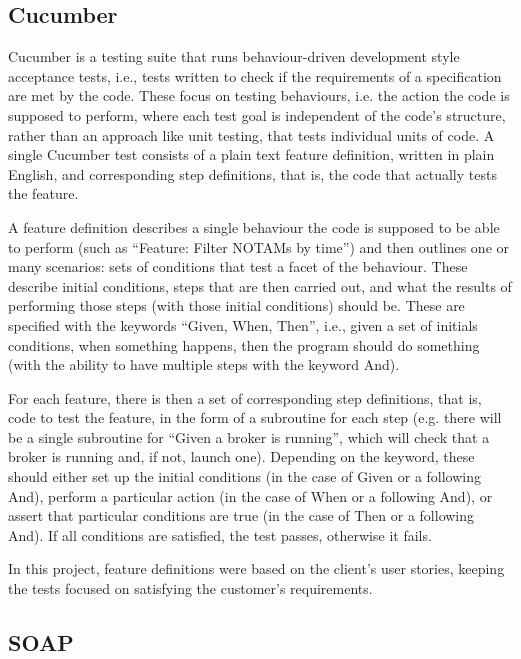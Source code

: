 \documentclass[a4paper, 12pt, twoside]{article}
\begin{document}
\subsection{Cucumber}
\label{sec:bg_cucumber}

Cucumber is a testing suite that runs behaviour-driven development style acceptance tests\cite{cucumber}, i.e., tests written to check if the requirements of a specification are met by the code. These focus on testing behaviours, i.e. the action the code is supposed to perform, where each test goal is independent of the code’s structure, rather than an approach like unit testing, that tests individual units of code.
A single Cucumber test consists of a plain text feature definition, written in plain English, and corresponding step definitions, that is, the code that actually tests the feature.

A feature definition describes a single behaviour the code is supposed to be able to perform (such as ``Feature: Filter NOTAMs by time'') and then outlines one or many scenarios: sets of conditions that test a facet of the behaviour. These describe initial conditions, steps that are then carried out, and what the results of performing those steps (with those initial conditions) should be. These are specified with the keywords ``Given, When, Then'', i.e., given a set of initials conditions, when something happens, then the program should do something (with the ability to have multiple steps with the keyword And).

For each feature, there is then a set of corresponding step definitions, that is, code to test the feature, in the form of a subroutine for each step (e.g. there will be a single subroutine for ``Given a broker is running'', which will check that a broker is running and, if not, launch one). Depending on the keyword, these should either set up the initial conditions (in the case of Given or a following And), perform a particular action (in the case of When or a following And), or assert that particular conditions are true (in the case of Then or a following And). If all conditions are satisfied, the test passes, otherwise it fails.

In this project, feature definitions were based on the client's user stories, keeping the tests focused on satisfying the customer's requirements.

\subsection{SOAP}
\label{sec:bg_soap}
\end{document}
